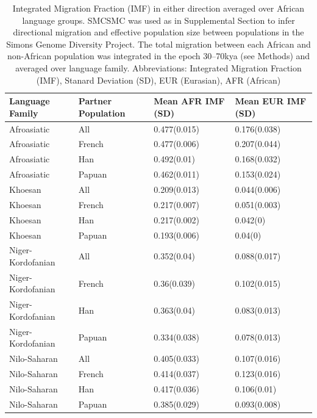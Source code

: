 \begin{table}[ht]
\centering
\begin{tabular}{llll}
  \hline
Language Family & Partner Population & Mean AFR IMF (SD) & Mean EUR IMF (SD) \\ 
  \hline
Afroasiatic & All & 0.477(0.015) & 0.176(0.038) \\ 
  Afroasiatic & French & 0.477(0.006) & 0.207(0.044) \\ 
  Afroasiatic & Han & 0.492(0.01) & 0.168(0.032) \\ 
  Afroasiatic & Papuan & 0.462(0.011) & 0.153(0.024) \\ 
  Khoesan & All & 0.209(0.013) & 0.044(0.006) \\ 
  Khoesan & French & 0.217(0.007) & 0.051(0.003) \\ 
  Khoesan & Han & 0.217(0.002) & 0.042(0) \\ 
  Khoesan & Papuan & 0.193(0.006) & 0.04(0) \\ 
  Niger-Kordofanian & All & 0.352(0.04) & 0.088(0.017) \\ 
  Niger-Kordofanian & French & 0.36(0.039) & 0.102(0.015) \\ 
  Niger-Kordofanian & Han & 0.363(0.04) & 0.083(0.013) \\ 
  Niger-Kordofanian & Papuan & 0.334(0.038) & 0.078(0.013) \\ 
  Nilo-Saharan & All & 0.405(0.033) & 0.107(0.016) \\ 
  Nilo-Saharan & French & 0.414(0.037) & 0.123(0.016) \\ 
  Nilo-Saharan & Han & 0.417(0.036) & 0.106(0.01) \\ 
  Nilo-Saharan & Papuan & 0.385(0.029) & 0.093(0.008) \\ 
   \hline
\end{tabular}
\caption[Tests for difference between integrated migration fractions in the SGDP averaged over African language families]{Integrated Migration Fraction (IMF) in either direction averaged over African language groups. SMCSMC was used as in Supplemental Section  to infer directional migration and effective population size between populations in the Simons Genome Diversity Project. The total migration between each African and non-African population was integrated in the epoch 30--70kya (see Methods) and averaged over language family. Abbreviations: Integrated Migration Fraction (IMF), Stanard Deviation (SD), EUR (Eurasian), AFR (African)} 
\label{table:average_sgdp_migration_table}
\end{table}

